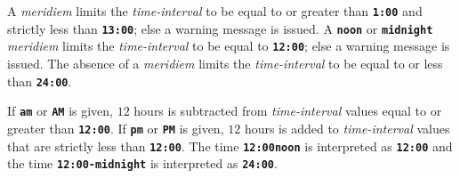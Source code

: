 \documentclass[12pt]{article}
\newcommand{\TT}[1]{{\tt \bfseries #1}}
\newlength{\figurewidth}
\newenvironment{boxedfigure}[1][!btp]%
	{\begin{figure*}[#1]
	 \begin{lrbox}{\figurebox}
	 \begin{minipage}{\figurewidth}

	 \vspace*{1ex}}%
	{
	 \vspace*{1ex}

	 \end{minipage}
	 \end{lrbox}
	 \begin{center}
	 \fbox{\hspace*{0.1in}\usebox{\figurebox}\hspace*{0.1in}}
	 \end{center}
	 \end{figure*}}
\begin{document}
A {\em meridiem} limits the {\em time-interval}
to be equal to or greater than \TT{1:00} and strictly less than
\TT{13:00}; else a warning message is issued.  A \TT{noon}
or \TT{midnight} {\em meridiem} limits the {\em time-interval}
to be equal to \TT{12:00}; else a warning message is issued.
The absence of a {\em meridiem} limits the {\em time-interval}
to be equal to or less than \TT{24:00}.

If \TT{am} or \TT{AM} is given, $12$ hours is subtracted from
{\em time-interval} values equal to or greater than \TT{12:00}.
If \TT{pm} or \TT{PM} is given, $12$ hours is added to
{\em time-interval} values that are strictly less than \TT{12:00}.
The time \TT{12:00noon} is interpreted as \TT{12:00} and
the time \TT{12:00-midnight} is interpreted as \TT{24:00}.

\begin{boxedfigure}[t]

\footnotesize


\end{boxedfigure}
\end{document}
